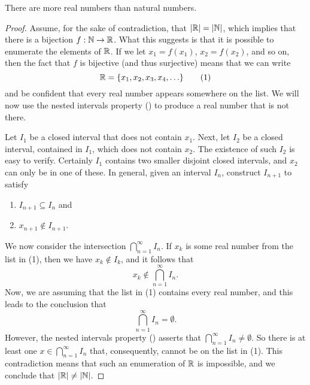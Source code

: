 \documentclass[11pt,twoside=off,numbers=noenddot]{scrbook}
\begin{document}
\begin{theorem}[$\abs{\RR} > \abs{\NN}$]
    There are more real numbers than natural numbers.
\end{theorem}

\begin{proof}
    Assume, for the sake of contradiction, that $| \mathbb R | = | \mathbb N |$, which implies that there is a bijection $f : \mathbb N \to \mathbb R$. What this suggests is that it is possible to enumerate the elements of $\mathbb R$. If we let $x_1 = f(x_1)$, $x_2 = f(x_2)$, and so on, then the fact that $f$ is bijective (and thus surjective) means that we can write
    \[ \RR = \set{x_1, x_2, x_3, x_4, \dots} \tag{1} \]
    and be confident that every real number appears somewhere on the list. We will now use the nested intervals property () to produce a real number that is not there.

    Let $I_1$ be a closed interval that does not contain $x_1$. Next, let $I_2$ be a closed interval, contained in $I_1$, which does not contain $x_2$. The existence of such $I_2$ is easy to verify. Certainly $I_1$ contains two smaller disjoint closed intervals, and $x_2$ can only be in one of these. In general, given an interval $I_n$, construct $I_{n + 1}$ to satisfy
    \begin{enumerate}
        \item $I_{n + 1} \subseteq I_n$ and
        \item $x_{n + 1} \notin I_{n + 1}$.
    \end{enumerate}
    We now consider the intersection $\bigcap_{n = 1}^{\infty} I_n$. If $x_k$ is some real number from the list in (1), then we have $x_k \notin I_k$, and it follows that
    \[ x_k \notin \bigcap_{n = 1}^{\infty} I_n. \]
    Now, we are assuming that the list in (1) contains every real number, and this leads to the conclusion that
    \[ \bigcap_{n = 1}^{\infty} I_n = \emptyset. \]
    However, the nested intervals property () asserts that $\bigcap_{n = 1}^{\infty} I_n \neq \emptyset$. So there is at least one $x \in \bigcap_{n = 1}^{\infty} I_n$ that, consequently, cannot be on the list in (1). This contradiction means that such an enumeration of $\mathbb R$ is impossible, and we conclude that $| \mathbb R | \neq | \mathbb N |$.


\end{proof}
\end{document}
